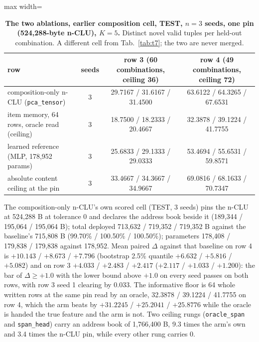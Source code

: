 \documentclass{article} %
\begin{document}
\begin{table}[h]
\centering\small
\caption{\textbf{The two ablations, earlier composition cell, TEST, $n=3$ seeds, one pin
(524,288-byte n-CLU), $K=5$.} Distinct novel valid tuples per held-out combination. A different cell from %
Tab.~\ref{tab:t7}; the two are never merged.}
\label{tab:ablations}
\setlength{\tabcolsep}{3pt}
\begin{adjustbox}{max width=\linewidth}\begin{tabular}{lccc}
\toprule
row & seeds & row 3 (60 combinations, ceiling 36) & row 4 (49 combinations, ceiling 72) \\ %
\midrule
composition-only n-CLU (\texttt{pca\_tensor}) & 3 & 29.7167 / 31.6167 / 31.4500 & 63.6122 / 64.3265 / 67.6531 \\
item memory, 64 rows, oracle read (ceiling) & 3 & 18.7500 / 18.2333 / 20.4667 & 32.3878 / 39.1224 / 41.7755 \\
learned reference (MLP, 178,952 params) & 3 & 25.6833 / 29.1333 / 29.0333 & 53.4694 / 55.6531 / 59.8571 \\
absolute content ceiling at the pin & 3 & 33.4667 / 34.3667 / 34.9667 & 69.0816 / 68.1633 / 70.7347 \\
\bottomrule
\end{tabular}\end{adjustbox}
\end{table}



The composition-only n-CLU's own scored cell (TEST, 3 seeds) pins the n-CLU at 524,288 B at
tolerance 0 and declares the address book beside it (189,344 / 195,064 / 195,064 B); total deployed
713,632 / 719,352 / 719,352 B against the baseline's 715,808 B (99.70\% / 100.50\% / 100.50\%);
parameters 178,408 / 179,838 / 179,838 against 178,952. %
Mean paired $\Delta$ against that baseline on row 4 is $+10.143$ / $+8.673$ / $+7.796$ (bootstrap
2.5\% quantile $+6.632$ / $+5.816$ / $+5.082$) and on row 3 $+4.033$ / $+2.483$ / $+2.417$
($+2.117$ / $+1.033$ / $+1.200$): the bar of $\Delta\ge+1.0$ with the lower bound above $+1.0$ on
every seed passes on both rows, with row 3 seed 1 clearing by 0.033.
The informative floor is 64 whole written rows at the same pin read by an oracle, 32.3878 / 39.1224
/ 41.7755 on row 4, which the arm beats by $+31.2245$ / $+25.2041$ / $+25.8776$ while the oracle is
handed the true feature and the arm is not. %
Two ceiling rungs (\texttt{oracle\_span} and \texttt{span\_head}) carry an address book of 1,766,400
B, 9.3 times the arm's own and 3.4 times the n-CLU pin, while every other rung carries 0.
\end{document}
